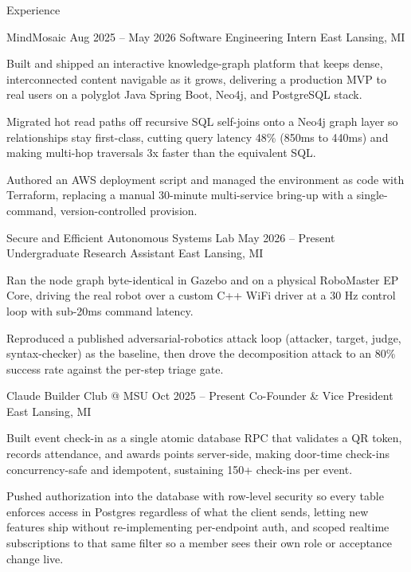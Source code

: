 \documentclass[
	11pt
]{../../../template}
\begin{document}
	\begin{rSection}{E}{xperience}
		\begin{rSectionEntry}
			{MindMosaic}
			{Aug 2025 -- May 2026}
			{Software Engineering Intern}
			{}
			{East Lansing, MI}

			\item Built and shipped an interactive knowledge-graph platform that keeps dense, interconnected content navigable as it grows, delivering a production MVP to real users on a polyglot Java Spring Boot, Neo4j, and PostgreSQL stack.
			\item Migrated hot read paths off recursive SQL self-joins onto a Neo4j graph layer so relationships stay first-class, cutting query latency 48\% (850ms to 440ms) and making multi-hop traversals 3x faster than the equivalent SQL.
			\item Authored an AWS deployment script and managed the environment as code with Terraform, replacing a manual 30-minute multi-service bring-up with a single-command, version-controlled provision.
		\end{rSectionEntry}

		\begin{rSectionEntry}
			{Secure and Efficient Autonomous Systems Lab}
			{May 2026 -- Present}
			{Undergraduate Research Assistant}
			{}
			{East Lansing, MI}

			\item Ran the node graph byte-identical in Gazebo and on a physical RoboMaster EP Core, driving the real robot over a custom C++ WiFi driver at a 30 Hz control loop with sub-20ms command latency.
			\item Reproduced a published adversarial-robotics attack loop (attacker, target, judge, syntax-checker) as the baseline, then drove the decomposition attack to an 80\% success rate against the per-step triage gate.
		\end{rSectionEntry}

		\begin{rSectionEntry}
			{Claude Builder Club @ MSU}
			{Oct 2025 -- Present}
			{Co-Founder \& Vice President}
			{}
			{East Lansing, MI}

			\item Built event check-in as a single atomic database RPC that validates a QR token, records attendance, and awards points server-side, making door-time check-ins concurrency-safe and idempotent, sustaining 150+ check-ins per event.
			\item Pushed authorization into the database with row-level security so every table enforces access in Postgres regardless of what the client sends, letting new features ship without re-implementing per-endpoint auth, and scoped realtime subscriptions to that same filter so a member sees their own role or acceptance change live.
		\end{rSectionEntry}
	\end{rSection}
\end{document}
